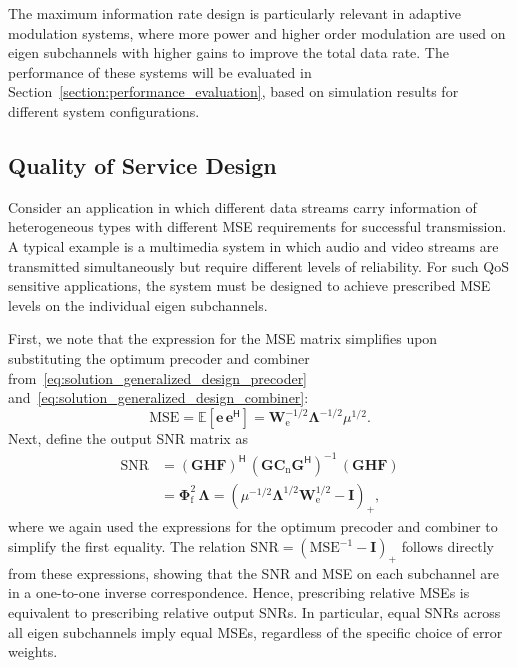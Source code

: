 The maximum information rate design is particularly relevant in adaptive modulation systems, where more power and higher order modulation are used on eigen subchannels with higher gains to improve the total data rate.
The performance of these systems will be evaluated in Section~\ref{section:performance_evaluation}, based on simulation results for different system configurations.

\subsection{Quality of Service Design}
\label{section:quality_of_service_design}
Consider an application in which different data streams carry information of heterogeneous types with different \ac{MSE} requirements for successful transmission. 
A typical example is a multimedia system in which audio and video streams are transmitted simultaneously but require different levels of reliability.
For such \acf{QoS} sensitive applications, the system must be designed to achieve prescribed \ac{MSE} levels on the individual eigen subchannels.

First, we note that the expression for the \ac{MSE} matrix simplifies upon substituting the optimum precoder and combiner from~\eqref{eq:solution_generalized_design_precoder} and~\eqref{eq:solution_generalized_design_combiner}:
\begin{equation}
\label{eq:mse_matrix_simplified}
    \text{MSE} 
    = \mathbb{E}\!\left[\mathbf{e}\, \mathbf{e}^{\mathsf{H}}\right]
    = \mathbf{W}^{-1/2}_{\mathrm{e}} \mathbf{\Lambda}^{- 1/2} \mu^{1/2}.
\end{equation}
Next, define the output \ac{SNR} matrix as
\begin{subequations}
\label{eq:snr_matrix}
\begin{align}
    \text{SNR} 
    &= (\mathbf{G}\mathbf{H}\mathbf{F})^{\mathsf{H}} \, (\mathbf{G} \mathbf{C}_{\mathrm{n}} \mathbf{G}^{\mathsf{H}})^{-1} \, (\mathbf{G}\mathbf{H}\mathbf{F}) \\
    &= \mathbf{\Phi}^2_{\mathrm{f}} \, \mathbf{\Lambda} = (\mu^{-1/2} \mathbf{\Lambda}^{1/2} \mathbf{W}^{1/2}_{\mathrm{e}} - \mathbf{I})_{+},
\end{align}
\end{subequations}
where we again used the expressions for the optimum precoder and combiner to simplify the first equality.
The relation $\text{SNR} = (\text{MSE}^{-1} - \mathbf{I})_{+}$ follows directly from these expressions, showing that the \ac{SNR} and \ac{MSE} on each subchannel are in a one-to-one inverse correspondence.
Hence, prescribing relative \acp{MSE} is equivalent to prescribing relative output \acp{SNR}.
In particular, equal \acp{SNR} across all eigen subchannels imply equal \acp{MSE}, regardless of the specific choice of error weights.

